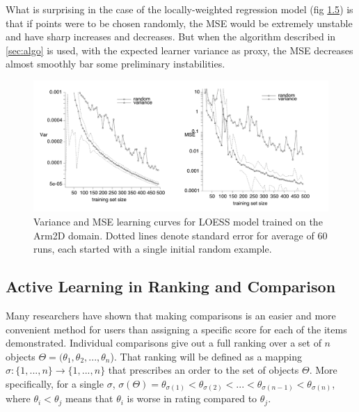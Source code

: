 \documentclass[
  letterpaper,
  DIV=11,
  numbers=noendperiod,
  oneside]{scrreprt}
\theoremstyle{remark}
\begin{document}
What is surprising in the case of the locally-weighted regression model
(fig \hyperref[fig:empirical:regress]{1.5}) is that if points were to be
chosen randomly, the MSE would be extremely unstable and have sharp
increases and decreases. But when the algorithm described in
\hyperref[sec:algo]{{[}sec:algo{]}} is used, with the expected learner
variance as proxy, the MSE decreases almost smoothly bar some
preliminary instabilities.

\begin{figure}

{\centering \includegraphics[width=1\textwidth,height=\textheight]{src/Figures/1_experiment_results_regression.png}

}

\caption{Variance and MSE learning curves for LOESS model trained on the
Arm2D domain. Dotted lines denote standard error for average of 60 runs,
each started with a single initial random example.}

\end{figure}%

\subsection{Active Learning in Ranking and
Comparison}\label{active-learning-in-ranking-and-comparison}

Many researchers have shown that making comparisons is an easier and
more convenient method for users than assigning a specific score for
each of the items demonstrated. Individual comparisons give out a full
ranking over a set of \(n\) objects
\(\Theta = (\theta_1, \theta_2, ..., \theta_n\)). That ranking will be
defined as a mapping \(\sigma : \{1,...,n\} \rightarrow \{1,...,n\}\)
that prescribes an order to the set of objects \(\Theta\). More
specifically, for a single \(\sigma\),
\(\sigma(\Theta) = \theta_{\sigma(1)} < \theta_{\sigma(2)} < ... < \theta_{\sigma(n-1)} < \theta_{\sigma(n)}\),
where \(\theta_{i} < \theta_{j}\) means that \(\theta_{i}\) is worse in
rating compared to \(\theta_{j}\).
\end{document}
